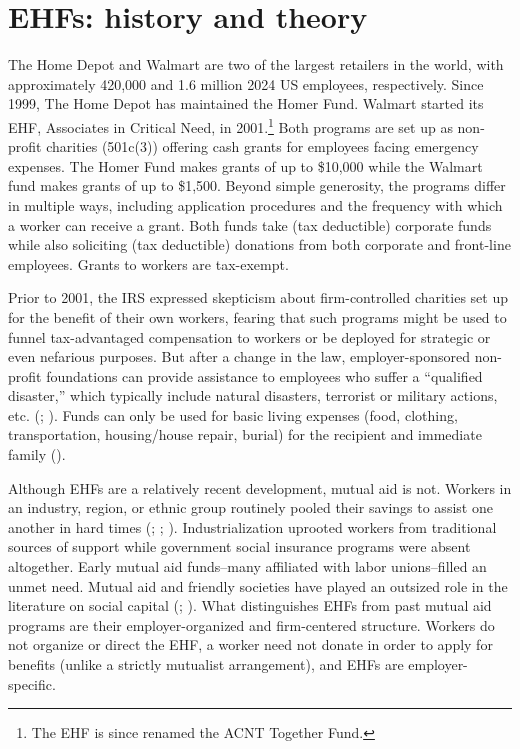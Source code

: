 \documentclass[
  11pt,
  oneside]{article}
\begin{document}
\section{EHFs: history and theory}\label{ehfs-history-and-theory}

The Home Depot and Walmart are two of the largest retailers in the world, with approximately 420,000 and 1.6 million 2024 US employees, respectively. Since 1999, The Home Depot has maintained the Homer Fund. Walmart started its EHF, Associates in Critical Need, in 2001.\footnote{The EHF is since renamed the ACNT Together Fund.} Both programs are set up as non-profit charities (501c(3)) offering cash grants for employees facing emergency expenses. The Homer Fund makes grants of up to \$10,000 while the Walmart fund makes grants of up to \$1,500. Beyond simple generosity, the programs differ in multiple ways, including application procedures and the frequency with which a worker can receive a grant. Both funds take (tax deductible) corporate funds while also soliciting (tax deductible) donations from both corporate and front-line employees. Grants to workers are tax-exempt.

Prior to 2001, the IRS expressed skepticism about firm-controlled charities set up for the benefit of their own workers, fearing that such programs might be used to funnel tax-advantaged compensation to workers or be deployed for strategic or even nefarious purposes. But after a change in the law, employer-sponsored non-profit foundations can provide assistance to employees who suffer a ``qualified disaster,'' which typically include natural disasters, terrorist or military actions, etc. (; ). Funds can only be used for basic living expenses (food, clothing, transportation, housing/house repair, burial) for the recipient and immediate family ().

Although EHFs are a relatively recent development, mutual aid is not. Workers in an industry, region, or ethnic group routinely pooled their savings to assist one another in hard times (; ; ). Industrialization uprooted workers from traditional sources of support while government social insurance programs were absent altogether. Early mutual aid funds--many affiliated with labor unions--filled an unmet need. Mutual aid and friendly societies have played an outsized role in the literature on social capital (; ). What distinguishes EHFs from past mutual aid programs are their employer-organized and firm-centered structure. Workers do not organize or direct the EHF, a worker need not donate in order to apply for benefits (unlike a strictly mutualist arrangement), and EHFs are employer-specific.
\end{document}
